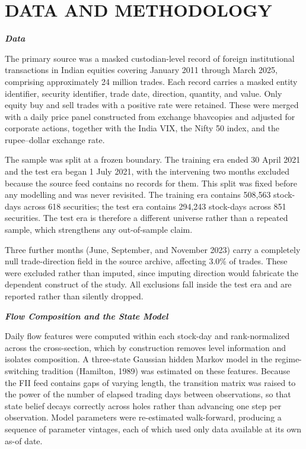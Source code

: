\documentclass[12pt]{article}
\begin{document}
\section*{DATA AND METHODOLOGY}

\textbf{\emph{Data}}

The primary source was a masked custodian-level record of foreign
institutional transactions in Indian equities covering January 2011 through
March 2025, comprising approximately 24 million trades. Each record carries a
masked entity identifier, security identifier, trade date, direction, quantity,
and value. Only equity buy and sell trades with a positive rate were retained.
These were merged with a daily price panel constructed from exchange
bhavcopies and adjusted for corporate actions, together with the India VIX,
the Nifty 50 index, and the rupee--dollar exchange rate.

The sample was split at a frozen boundary. The training era ended 30 April
2021 and the test era began 1 July 2021, with the intervening two months
excluded because the source feed contains no records for them. This split was
fixed before any modelling and was never revisited. The training era contains
508,563 stock-days across 618 securities; the test era contains 294,243
stock-days across 851 securities. The test era is therefore a different
universe rather than a repeated sample, which strengthens any out-of-sample
claim.

Three further months (June, September, and November 2023) carry a completely
null trade-direction field in the source archive, affecting 3.0\% of trades.
These were excluded rather than imputed, since imputing direction would
fabricate the dependent construct of the study. All exclusions fall inside the
test era and are reported rather than silently dropped.

\textbf{\emph{Flow Composition and the State Model}}

Daily flow features were computed within each stock-day and rank-normalized
across the cross-section, which by construction removes level information and
isolates composition. A three-state Gaussian hidden Markov model in the
regime-switching tradition (Hamilton, 1989) was estimated on these features. Because the FII feed contains gaps of varying length, the
transition matrix was raised to the power of the number of elapsed trading
days between observations, so that state belief decays correctly across
holes rather than advancing one step per observation. Model parameters were
re-estimated walk-forward, producing a sequence of parameter vintages, each
of which used only data available at its own as-of date.
\end{document}
